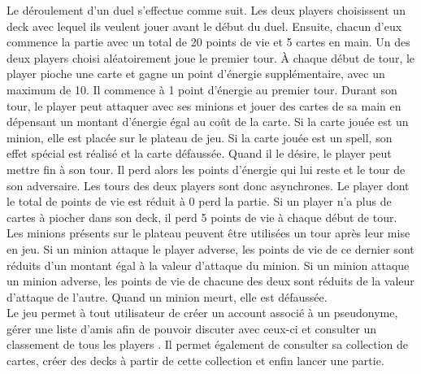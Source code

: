 Le déroulement d'un duel s'effectue comme suit. Les deux players choisissent un deck avec lequel ils veulent jouer avant le début du duel. Ensuite, chacun d'eux commence la partie avec un total de 20 points de vie et 5 cartes en main. Un des deux players choisi aléatoirement joue le premier tour. À chaque début de tour, le player pioche une carte et gagne un point d'énergie supplémentaire, avec un maximum de 10. Il commence à 1 point d'énergie au premier tour. Durant son tour, le player peut attaquer avec ses minions et jouer des cartes de sa main en dépensant un montant d'énergie égal au coût de la carte. Si la carte jouée est un minion, elle est placée sur le plateau de jeu. Si la carte jouée est un spell, son effet spécial est réalisé et la carte défaussée. Quand il le désire, le player peut mettre fin à son tour. Il perd alors les points d'énergie qui lui reste et le tour de son adversaire. Les tours des deux players sont donc asynchrones. Le player dont le total de points de vie est réduit à 0 perd la partie. Si un player n'a plus de cartes à piocher dans son deck, il perd 5 points de vie à chaque début de tour.\\
Les minions présents sur le plateau peuvent être utilisées un tour après leur mise en jeu. Si un minion attaque le player adverse, les points de vie de ce dernier sont réduits d'un montant égal à la valeur d'attaque du minion. Si un minion attaque un minion adverse, les points de vie de chacune des deux sont réduits de la valeur d'attaque de l'autre. Quand un minion meurt, elle est défaussée.\\
Le jeu permet à tout utilisateur de créer un account associé à un pseudonyme, gérer une liste d'amis afin de pouvoir discuter avec ceux-ci et consulter un classement de tous les players . Il permet également de consulter sa collection de cartes, créer des decks à partir de cette collection et enfin lancer une partie.\\\\
